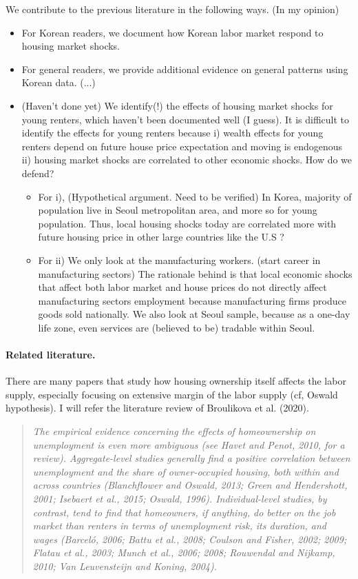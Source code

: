 \documentclass[10pt]{article}
\theoremstyle{definition}
\theoremstyle{remark}
\begin{document}
We contribute to the previous literature in the following ways. (In my opinion)
\begin{itemize}
	\item For Korean readers, we document how Korean labor market respond to housing market shocks.
	\item For general readers, we provide additional evidence on general patterns using Korean data. (...)
	\item (Haven't done yet) We identify(!) the effects of housing market shocks for young renters, which haven't been documented well (I guess). It is difficult to identify the effects for young renters because i) wealth effects for young renters depend on future house price expectation and moving is endogenous ii) housing market shocks are correlated to other economic shocks. How do we defend?
	\begin{itemize}
		\item For i), (Hypothetical argument. Need to be verified) In Korea, majority of population live in Seoul metropolitan area, and more so for young population. Thus, local housing shocks today are correlated more with future housing price in other large countries like the U.S ?  
		\item For ii) We only look at the manufacturing workers. (start career in manufacturing sectors) The rationale behind is that local economic shocks that affect both labor market and house prices do not directly affect manufacturing sectors employment because manufacturing firms produce goods sold nationally. We also look at Seoul sample, because as a one-day life zone, even services are (believed to be) tradable within Seoul. 
	\end{itemize}
\end{itemize}

\paragraph{Related literature.} There are many papers that study how housing ownership itself affects the labor supply, especially focusing on extensive margin of the labor supply (cf, Oswald hypothesis). I will refer the literature review of Broulikova et al. (2020).

\begin{quote}
    \textit{The empirical evidence concerning the effects of homeownership on unemployment is even more ambiguous (see Havet and Penot, 2010, for a review). Aggregate-level studies generally find a positive correlation between unemployment and the share of owner-occupied housing, both within and across countries (Blanchflower and Oswald, 2013; Green and Hendershott, 2001; Isebaert et al., 2015; Oswald, 1996). Individual-level studies, by contrast, tend to find that homeowners, if anything, do better on the job market than renters in terms of unemployment risk, its duration, and wages (Barceló, 2006; Battu et al., 2008; Coulson and Fisher, 2002; 2009; Flatau et al., 2003; Munch et al., 2006; 2008; Rouwendal and Nijkamp, 2010; Van Leuvensteijn and Koning, 2004).}
\end{quote}
\end{document}
